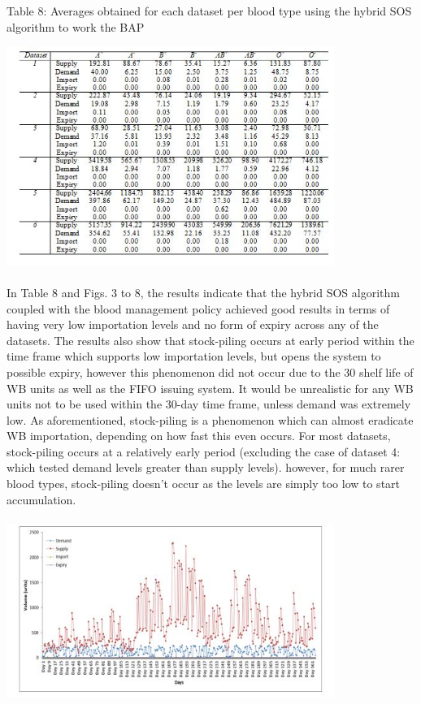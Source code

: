 \documentclass{article}
\begin{document}
\begin {center}
Table 8: {Averages obtained for each dataset per blood type using the hybrid SOS algorithm to work the BAP}

\end {center}
\includegraphics[width=0.8\textwidth, center]{Images/Tab8.JPG}
\\
\\
In Table 8 and Figs. 3 to 8, the results indicate that the hybrid SOS algorithm coupled with the blood management policy achieved good results in terms of having very low importation levels and no form of expiry across any of the datasets. The results also show that stock-piling occurs at early period within the time frame which supports low importation levels, but opens the system to possible expiry, however this phenomenon did not occur due to the 30 shelf life of WB units as well as the FIFO issuing system. It would be unrealistic for any WB units not to be used within the 30-day time frame, unless demand was extremely low. As aforementioned, stock-piling is a phenomenon which can almost eradicate WB importation, depending on how fast this even occurs. For most datasets, stock-piling occurs at a relatively early period (excluding the case of dataset 4: which tested demand levels greater than supply levels). however, for much rarer blood types, stock-piling doesn’t occur as the levels are simply too low to start accumulation.
\\
\\
\includegraphics[width=0.8\textwidth, center]{Images/Fig3.JPG}
\end{document}
